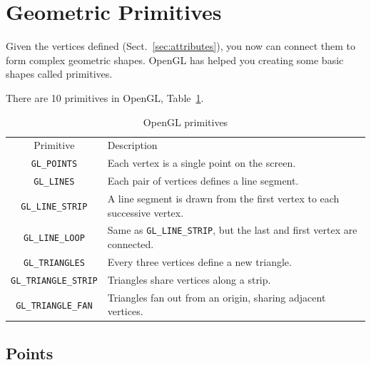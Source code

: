\section{Geometric Primitives}
\label{sec:primitives}

Given the vertices defined (Sect.~\ref{sec:attributes}), you now can
connect them to form complex geometric shapes. OpenGL has helped you
creating some basic shapes called primitives.

There are 10 primitives in OpenGL,
Table~\ref{tab:geometric_primitives}.

\begin{table}[hbt]
  \begin{center}
    \caption{OpenGL primitives\protect\footnotemark[1]}
    \begin{tabular}{cp{8cm}} 
      \hline
      Primitive &  Description\\
      \verb!GL_POINTS! & Each vertex is a single point on the screen. \\
      \verb!GL_LINES! &  Each pair of vertices defines a line segment. \\
      \verb!GL_LINE_STRIP! & A line segment is drawn from the first vertex to each successive vertex.\\
      \verb!GL_LINE_LOOP! & Same as \verb!GL_LINE_STRIP!, but the last and first
      vertex are connected. \\
      \verb!GL_TRIANGLES! & Every three vertices define a new triangle. \\
      \verb!GL_TRIANGLE_STRIP! & Triangles share vertices along a strip. \\
      \verb!GL_TRIANGLE_FAN! & Triangles fan out from an origin, sharing adjacent
      vertices.\\
      \hline\hline
    \end{tabular}
  \end{center}
  \label{tab:geometric_primitives}
\end{table}


\subsection{Points}
\label{sec:points}

